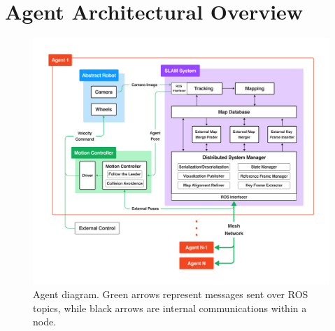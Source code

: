 






\label{sec:3}

\section{Agent Architectural Overview}
\label{sec:architectural-overview}

\begin{figure}[h]
    \centering
    \includegraphics[trim=5cm 5cm 5cm 5cm, scale=0.2]{figures/agent_diagram.pdf}
    \caption{Agent diagram. Green arrows represent messages sent over ROS topics, while black arrows are internal communications within a node.}
    \label{fig:agent-diagram}
\end{figure}

